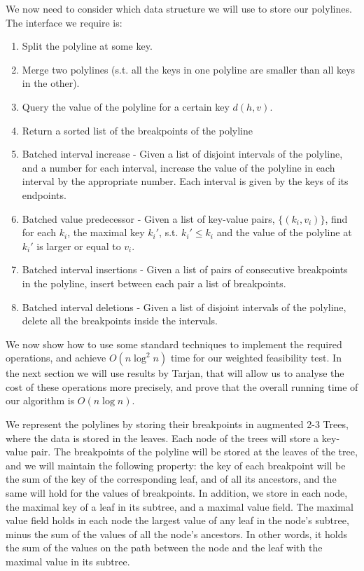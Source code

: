 \documentclass[11pt,a4paper]{article}
\theoremstyle{definition}
\theoremstyle{remark}
\begin{document}
We now need to consider which data structure we will use to store our polylines. The interface we require is:
\begin{enumerate}
\item Split the polyline at some key.
\item Merge two polylines (s.t. all the keys in one polyline are smaller than all keys in the other).
\item Query the value of the polyline for a certain key $d(h,v)$.
\item Return a sorted list of the breakpoints of the polyline
\item Batched interval increase - Given a list of disjoint intervals of the polyline, and a number for each interval, increase the value of the polyline in each interval by the appropriate number. Each interval is given by the keys of its endpoints.
\item Batched value predecessor - Given a list of key-value pairs, $\{(k_i,v_i)\}$, find for each $k_i$, the maximal key $k_{i}'$, s.t. $k_{i}' \leq k_i$ and the value of the polyline at $k_{i}'$ is larger or equal to $v_i$.
\item Batched interval insertions - Given a list of pairs of consecutive breakpoints in the polyline, insert between each pair a list of breakpoints.
\item Batched interval deletions - Given a list of disjoint intervals of the polyline, delete all the breakpoints inside the intervals.
\end{enumerate}

We now show how to use some standard techniques to implement the required operations, and achieve $O(n \log ^2 n)$ time for our weighted feasibility test. In the next section we will use results by Tarjan, that will allow us to analyse the cost of these operations more precisely, and prove that the overall running time of our algorithm is $O(n \log n)$.

We represent the polylines by storing their breakpoints in augmented 2-3 Trees, where the data is stored in the leaves. Each node of the trees will store a key-value pair. The breakpoints of the polyline will be stored at the leaves of the tree, and we will maintain the following property: the key of each breakpoint will be the sum of the key of the corresponding leaf, and of all its ancestors, and the same will hold for the values of breakpoints. In addition, we store in each node, the maximal key of a leaf in its subtree, and a maximal value field. The maximal value field holds in each node the largest value of any leaf in the node's subtree, minus the sum of the values of all the node's ancestors. In other words, it holds the sum of the values on the path between the node and the leaf with the maximal value in its subtree.
\end{document}
